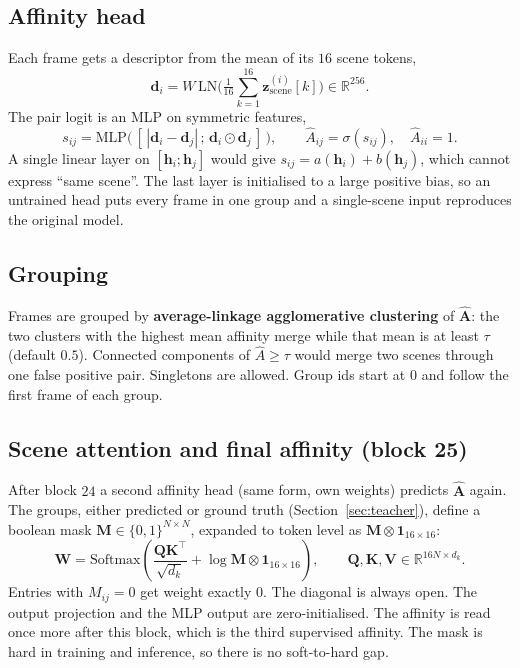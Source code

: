 \documentclass[11pt, a4paper]{article}
\newcommand{\zscene}{\bm{z}_{\mathrm{scene}}}
\begin{document}
\subsection{Affinity head}
\label{sec:affinity}
Each frame gets a descriptor from the mean of its $16$ scene tokens,
\begin{equation}
  \bm{d}_i = W\,\mathrm{LN}\!\Big(\tfrac{1}{16}\sum_{k=1}^{16}\zscene^{(i)}[k]\Big) \in \mathbb{R}^{256}.
\end{equation}
The pair logit is an MLP on symmetric features,
\begin{equation}
  s_{ij} = \mathrm{MLP}\big(\,[\,|\bm{d}_i - \bm{d}_j| \,;\, \bm{d}_i \odot \bm{d}_j\,]\,\big),
  \qquad \hat A_{ij} = \sigma(s_{ij}), \quad \hat A_{ii} = 1 .
\end{equation}
A single linear layer on $[\bm{h}_i;\bm{h}_j]$ would give $s_{ij} = a(\bm{h}_i) + b(\bm{h}_j)$, which
cannot express ``same scene''. The last layer is initialised to a large positive bias, so an
untrained head puts every frame in one group and a single-scene input reproduces the original
model.

\subsection{Grouping}
Frames are grouped by \textbf{average-linkage agglomerative clustering} of $\hat{\bm{A}}$: the
two clusters with the highest mean affinity merge while that mean is at least $\tau$ (default
$0.5$). Connected components of $\hat A \ge \tau$ would merge two scenes through one false
positive pair. Singletons are allowed. Group ids start at $0$ and follow the first frame of
each group.

\subsection{Scene attention and final affinity (block 25)}
After block $24$ a second affinity head (same form, own weights) predicts $\hat{\bm{A}}$ again. The
groups, either predicted or ground truth (Section~\ref{sec:teacher}), define a boolean mask
$\bm{M}\in\{0,1\}^{N\times N}$, expanded to token level as $\bm{M}\otimes\bm{1}_{16\times16}$:
\begin{equation}
  \bm{W} = \mathrm{Softmax}\!\left(\frac{\bm{Q}\bm{K}^{\top}}{\sqrt{d_k}} + \log \bm{M}\otimes\bm{1}_{16\times 16}\right),
  \qquad \bm{Q},\bm{K},\bm{V}\in\mathbb{R}^{16N\times d_k}.
\end{equation}
Entries with $M_{ij}=0$ get weight exactly $0$. The diagonal is always open. The output
projection and the MLP output are zero-initialised. The affinity is read once more after this
block, which is the third supervised affinity. The mask is hard in training and inference, so
there is no soft-to-hard gap.
\end{document}
